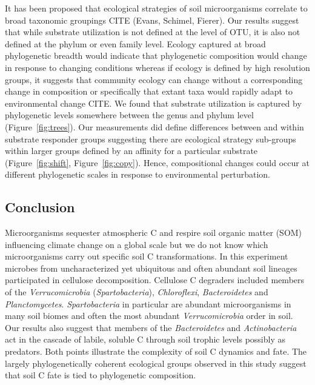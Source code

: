 It has been proposed that ecological strategies of soil microorganisms
correlate to broad taxonomic groupings CITE (Evans, Schimel, Fierer). Our
results suggest that while substrate utilization is not defined at the level of
OTU, it is also not defined at the phylum or even family level. Ecology
captured at broad phylogenetic breadth would indicate that phylogenetic
composition would change in response to changing conditions whereas if ecology
is defined by high resolution groups, it suggests that community ecology can
change without a corresponding change in composition or specifically that
extant taxa would rapidly adapt to environmental change CITE. We found that
substrate utilization is captured by phylogenetic levels somewhere between the
genus and phylum level (Figure~\ref{fig:trees}). Our measurements did define
differences between and within substrate responder groups suggesting there are
ecological strategy sub-groups within larger groups defined by an affinity
for a particular substrate (Figure~\ref{fig:shift},
Figure~\ref{fig:copy}). Hence, compositional changes could occur at
different phylogenetic scales in response to environmental perturbation. 

\subsection{Conclusion} 
Microorganisms sequester atmospheric C and respire soil organic matter (SOM)
influencing climate change on a global scale but we do not know which
microorganisms carry out specific soil C transformations. In this experiment
microbes from uncharacterized yet ubiquitous and often abundant soil lineages
participated in cellulose decomposition. Cellulose C degraders included members
of the \textit{Verrucomicrobia} (\textit{Spartobacteria}),
\textit{Chloroflexi}, \textit{Bacteroidetes} and \textit{Planctomycetes}.
\textit{Spartobacteria} in particular are abundant microorganisms in many soil
biomes and often the most abundant \textit{Verrucomicrobia} order in soil. Our
results also suggest that members of the \textit{Bacteroidetes} and
\textit{Actinobacteria} act in the cascade of labile, soluble C through soil
trophic levels possibly as predators. Both points illustrate the
complexity of soil C dynamics and fate. The largely phylogenetically
coherent ecological groups observed in this study suggest that soil C fate
is tied to phylogenetic composition.
